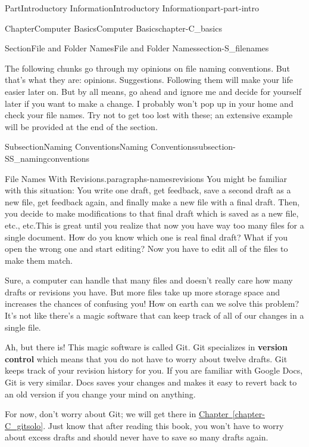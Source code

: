 \documentclass[oneside,10pt,]{book}
\newcommand{\xreffont}{\relax}
\newcommand{\terminology}[1]{\textbf{#1}}
\begin{document}
\begin{partptx}{Part}{Introductory Information}{}{Introductory Information}{}{}{part-part-intro}
\begin{chapterptx}{Chapter}{Computer Basics}{}{Computer Basics}{}{}{chapter-C_basics}
\begin{sectionptx}{Section}{File and Folder Names}{}{File and Folder Names}{}{}{section-S_filenames}
\begin{introduction}{}
\par
The following chunks go through my opinions on file naming conventions. But that's what they are: opinions. Suggestions. Following them will make your life easier later on. But by all means, go ahead and ignore me and decide for yourself later if you want to make a change. I probably won't pop up in your home and check your file names. Try not to get too lost with these; an extensive example will be provided at the end of the section.%
\end{introduction}%
%
%
\typeout{************************************************}
\typeout{************************************************}
%
\begin{subsectionptx}{Subsection}{Naming Conventions}{}{Naming Conventions}{}{}{subsection-SS_namingconventions}
\begin{paragraphs}{File Names With Revisions.}{paragraphs-namesrevisions}%
%
%
You might be familiar with this situation: You write one draft, get feedback, save a second draft as a new file, get feedback again, and finally make a new file with a final draft. Then, you decide to make modifications to that final draft which is saved as a new file, etc., etc.This is great until you realize that now you have way too many files for a single document. How do you know which one is real final draft? What if you open the wrong one and start editing? Now you have to edit all of the files to make them match.%
\par
Sure, a computer can handle that many files and doesn't really care how many drafts or revisions you have. But more files take up more storage space and increases the chances of confusing you! How on earth can we solve this problem? It's not like there's a magic software that can keep track of all of our changes in a single file.%
\par
Ah, but there is! This magic software is called Git. Git specializes in \terminology{version control} which means that you do not have to worry about twelve drafts. Git keeps track of your revision history for you. If you are familiar with Google Docs, Git is very similar. Docs saves your changes and makes it easy to revert back to an old version if you change your mind on anything.%
\par
For now, don't worry about Git; we will get there in \hyperref[chapter-C_gitsolo]{Chapter~{\xreffont\ref{chapter-C_gitsolo}}}. Just know that after reading this book, you won't have to worry about excess drafts and should never have to save so many drafts again.%

\end{paragraphs}
\end{subsectionptx}
\end{sectionptx}
\end{chapterptx}
\end{partptx}
\end{document}

